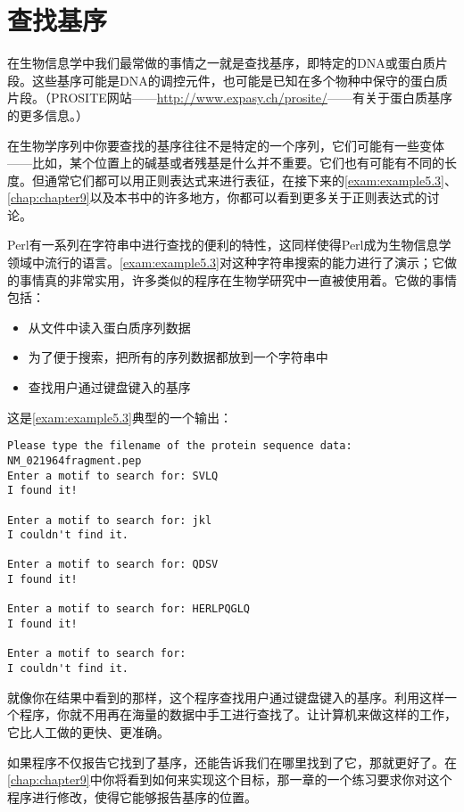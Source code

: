 \section{查找基序}
在生物信息学中我们最常做的事情之一就是查找基序，即特定的DNA或蛋白质片段。这些基序可能是DNA的调控元件，也可能是已知在多个物种中保守的蛋白质片段。（PROSITE网站——\href{http://www.expasy.ch/prosite/}{http://www.expasy.ch/prosite/}——有关于蛋白质基序的更多信息。）

在生物学序列中你要查找的基序往往不是特定的一个序列，它们可能有一些变体——比如，某个位置上的碱基或者残基是什么并不重要。它们也有可能有不同的长度。但通常它们都可以用正则表达式来进行表征，在接下来的\autoref{exam:example5.3}、\autoref{chap:chapter9}以及本书中的许多地方，你都可以看到更多关于正则表达式的讨论。

Perl有一系列在字符串中进行查找的便利的特性，这同样使得Perl成为生物信息学领域中流行的语言。\autoref{exam:example5.3}对这种字符串搜索的能力进行了演示；它做的事情真的非常实用，许多类似的程序在生物学研究中一直被使用着。它做的事情包括：

\begin{itemize}
  \item 从文件中读入蛋白质序列数据
  \item 为了便于搜索，把所有的序列数据都放到一个字符串中
  \item 查找用户通过键盘键入的基序
\end{itemize}



这是\autoref{exam:example5.3}典型的一个输出：

\begin{lstlisting}
Please type the filename of the protein sequence data:
NM_021964fragment.pep
Enter a motif to search for: SVLQ
I found it!

Enter a motif to search for: jkl
I couldn't find it.

Enter a motif to search for: QDSV
I found it!

Enter a motif to search for: HERLPQGLQ
I found it!

Enter a motif to search for: 
I couldn't find it. 
\end{lstlisting}

就像你在结果中看到的那样，这个程序查找用户通过键盘键入的基序。利用这样一个程序，你就不用再在海量的数据中手工进行查找了。让计算机来做这样的工作，它比人工做的更快、更准确。

如果程序不仅报告它找到了基序，还能告诉我们在哪里找到了它，那就更好了。在\autoref{chap:chapter9}中你将看到如何来实现这个目标，那一章的一个练习要求你对这个程序进行修改，使得它能够报告基序的位置。

